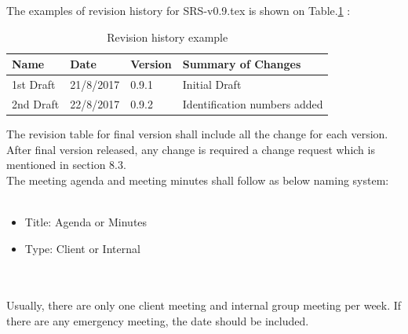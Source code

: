 The examples of revision history for SRS-v0.9.tex is shown on Table.\ref{my-labelxxxx} :\\

\begin{table}[]
	\centering
	\caption{Revision history example}
	\label{my-labelxxxx}
	\begin{tabular}{|l|l|l|l|}
		\hline
		Name      & Date      & Version & Summary of Changes           \\ \hline
		1st Draft & 21/8/2017 & 0.9.1   & Initial Draft                \\ \hline
		2nd Draft & 22/8/2017 & 0.9.2   & Identification numbers added \\ \hline
	\end{tabular}
\end{table}


The revision table for final version shall include all the change for each version. After final version released, any change is required a change request which is mentioned in section 8.3.\\


The meeting agenda and meeting minutes shall follow as below naming system:\\
\texttt{}\\
\begin{itemize}
\item Title: Agenda or Minutes
\item Type: Client or Internal
\end{itemize}
\texttt{} \\\\
Usually, there are only one client meeting and internal group meeting per week. If there are any emergency meeting, the date should be included.\\\\
\texttt{}\\
\texttt{}\\

